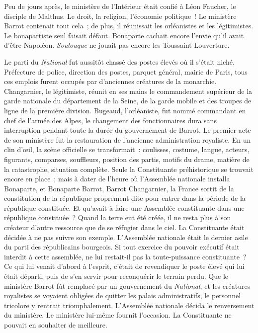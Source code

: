 \documentclass[twoside]{book} %
\begin{document}
Peu de jours après, le ministère de l’Intérieur était confié à Léon Faucher, le disciple de Malthus. Le droit, la religion, l’économie politique ! Le ministère Barrot contenait tout cela ; de plus, il réunissait les orléanistes et les légitimistes. Le bonapartiste seul faisait défaut. Bonaparte cachait encore l’envie qu’il avait d’être Napoléon. \emph{Soulouque} ne jouait pas encore les Toussaint-Louverture.\par
Le parti du \emph{National} fut aussitôt chassé des postes élevés où il s’était niché. Préfecture de police, direction des postes, parquet général, mairie de Paris, tous ces emplois furent occupés par d’anciennes créatures de la monarchie. Changarnier, le légitimiste, réunit en ses mains le commandement supérieur de la garde nationale du département de la Seine, de la garde mobile et des troupes de ligne de la première division. Bugeaud, l’orléaniste, fut nommé commandant en chef de l’armée des Alpes, le changement des fonctionnaires dura sans interruption pendant toute la durée du gouvernement de Barrot. Le premier acte de son ministère fut la restauration de l’ancienne administration royaliste. En un clin d’œil, la scène officielle se transformait : coulisses, costume, langue, acteurs, figurants, comparses, souffleurs, position des partis, motifs du drame, matière de la catastrophe, situation complète. Seule la Constituante préhistorique se trouvait encore en place ; mais à dater de l’heure où l’Assemblée nationale installa Bonaparte, et Bonaparte Barrot, Barrot Changarnier, la France sortit de la constitution de la république proprement dite pour entrer dans la période de la république constituée. Et qu’avait à faire une Assemblée constituante dans une république constituée ? Quand la terre eut été créée, il ne resta plus à son créateur d’autre ressource que de se réfugier dans le ciel. La Constituante était décidée à ne pas suivre son exemple. L’Assemblée nationale était le dernier asile du parti des républicains bourgeois. Si tout exercice du pouvoir exécutif était interdit à cette assemblée, ne lui restait-il pas la toute-puissance constituante ? Ce qui lui venait d’abord à l’esprit, c’était de revendiquer le poste élevé qui lui était départi, puis de s’en servir pour reconquérir le terrain perdu. Que le ministère Barrot fût remplacé par un gouvernement du \emph{National}, et les créatures royalistes se voyaient obligées de quitter les palais administratifs, le personnel tricolore y rentrait triomphalement. L’Assemblée nationale décida le renversement du ministère. Le ministère lui-même fournit l’occasion. La Constituante ne pouvait en souhaiter de meilleure.\par
\end{document}
